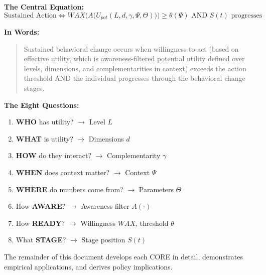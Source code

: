 \begin{tcolorbox}[colback=gray!5!white, colframe=gray!75!black,
    title=\textbf{EBF: The 10C CORE Framework}]

\textbf{The Central Equation:}
\begin{equation}
\text{Sustained Action} \Leftrightarrow WAX\Big(A\big(U_{pot}(L, d, \gamma, \Psi, \Theta)\big)\Big) \geq \theta(\Psi) \text{ AND } S(t) \text{ progresses}
\end{equation}

\textbf{In Words:}
\begin{quote}
Sustained behavioral change occurs when willingness-to-act (based on effective utility, which is
awareness-filtered potential utility defined over levels, dimensions, and
complementarities in context) exceeds the action threshold AND the individual
progresses through the behavioral change stages.
\end{quote}

\textbf{The Eight Questions:}
\begin{enumerate}
\item \textbf{WHO} has utility? $\rightarrow$ Level $L$
\item \textbf{WHAT} is utility? $\rightarrow$ Dimensions $d$
\item \textbf{HOW} do they interact? $\rightarrow$ Complementarity $\gamma$
\item \textbf{WHEN} does context matter? $\rightarrow$ Context $\Psi$
\item \textbf{WHERE} do numbers come from? $\rightarrow$ Parameters $\Theta$
\item How \textbf{AWARE}? $\rightarrow$ Awareness filter $A(\cdot)$
\item How \textbf{READY}? $\rightarrow$ Willingness $WAX$, threshold $\theta$
\item What \textbf{STAGE}? $\rightarrow$ Stage position $S(t)$
\end{enumerate}

\end{tcolorbox}

The remainder of this document develops each CORE in detail, demonstrates
empirical applications, and derives policy implications.


